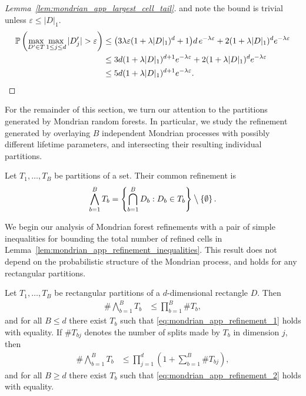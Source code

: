 \begin{proof}[Lemma~\ref{lem:mondrian_app_largest_cell_tail}]
  and note the bound is trivial unless $\varepsilon \leq |D|_1$.
  \begin{align*}
    \P\left(
      \max_{D' \in T}
      \max_{1 \leq j \leq d}
      |D'_j| > \varepsilon
    \right)
    &\leq
    \big( 3 \lambda \varepsilon (1 + \lambda |D|_1)^d + 1 \big)
    d \, e^{-\lambda \varepsilon}
    + 2 (1 + \lambda |D|_1)^d
    e^{-\lambda \varepsilon} \\
    &\leq
    3d (1 + \lambda |D|_1)^{d+1}
    e^{-\lambda \varepsilon}
    + 2 (1 + \lambda |D|_1)^d
    e^{-\lambda \varepsilon} \\
    &\leq
    5d (1 + \lambda |D|_1)^{d+1}
    e^{-\lambda \varepsilon}.
  \end{align*}
\end{proof}

For the remainder of this section, we turn our attention to the partitions
generated by Mondrian random forests. In particular, we study the refinement
generated by overlaying $B$ independent Mondrian processes with possibly
different lifetime parameters, and intersecting their resulting individual
partitions.

\begin{definition}%
  Let $T_1, \ldots, T_B$ be partitions of a set.
  Their common refinement is
  \begin{align*}
    \bigwedge_{b=1}^B T_b
    = \left\{
      \bigcap_{b=1}^B D_b:
      D_b \in T_b
    \right\}
    \bigsetminus
    \left\{ \emptyset \right\}.
  \end{align*}
\end{definition}

We begin our analysis of Mondrian forest refinements with a pair of simple
inequalities for bounding the total number of refined cells
in Lemma~\ref{lem:mondrian_app_refinement_inequalities}. This result does not
depend
on the probabilistic structure of the Mondrian process, and holds for any
rectangular partitions.

\begin{lemma}
  \label{lem:mondrian_app_refinement_inequalities}

  Let $T_1, \ldots, T_B$ be rectangular partitions of a $d$-dimensional
  rectangle $D$. Then
  \begin{align}
    \label{eq:mondrian_app_refinement_1}
    \# \bigwedge_{b=1}^B T_b
    &\leq \prod_{b=1}^B \# T_b,
  \end{align}
  and for all $B \leq d$ there exist $T_b$ such that
  \eqref{eq:mondrian_app_refinement_1} holds with equality.
  If $\# T_{b j}$ denotes the number of splits
  made by $T_b$ in dimension $j$, then
  \begin{align}
    \label{eq:mondrian_app_refinement_2}
    \# \bigwedge_{b=1}^B T_b
    &\leq \prod_{j=1}^d
    \left( 1 + \sum_{b=1}^B \# T_{b j} \right),
  \end{align}
  and for all $B \geq d$ there exist $T_b$ such that
  \eqref{eq:mondrian_app_refinement_2} holds with equality.

\end{lemma}

